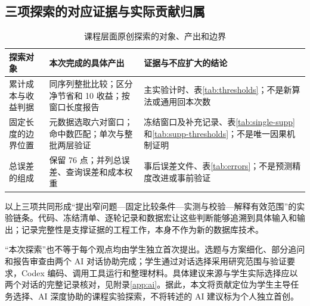 \subsection{三项探索的对应证据与实际贡献归属}
\begin{table}[htbp]
\centering\small
\caption{课程层面原创探索的对象、产出和边界}\label{tab:innovation-map}
\begin{tabularx}{\linewidth}{@{}>{\raggedright\arraybackslash}p{.18\linewidth}YY@{}}
\toprule
探索对象 & 本次完成的具体产出 & 证据与不应扩大的结论\\
\midrule
累计成本与收益判据 & 同序列整批比较；区分净节省和 10\pct{} 收益；按窗口长度报告 & 主实验计时、表\ref{tab:thresholds}；不是新算法或通用回本次数\\
固定长度的边界位置 & 元数据选取六对窗口；命中数匹配；单次与整批两层验证 & 冻结窗口及补充记录、表\ref{tab:single-supp}和\ref{tab:supp-thresholds}；不是唯一因果机制证明\\
总误差的组成 & 保留 76 点；并列总误差、查询误差和成本权重 & 事后误差文件、表\ref{tab:errors}；不是预测精度改进或事前验证\\
\bottomrule
\end{tabularx}
\end{table}

以上三项共同形成“提出窄问题---固定比较条件---实测与校验---解释有效范围”的实验链条。代码、冻结清单、逐轮记录和数据宏让这些判断能够追溯到具体输入和输出；记录完整性是支撑证据的工程工作，本身不作为新的数据库技术。

“本次探索”也不等于每个观点均由学生独立首次提出。选题与方案细化、部分追问和报告审查由两个 AI 对话协助完成；学生通过对话选择采用研究范围与验证要求，Codex 编码、调用工具运行和整理材料。具体建议来源与学生实际选择应以两个对话的完整记录核对，见附录\ref{app:ai}。据此，本文将贡献定位为学生主导任务选择、AI 深度协助的课程实验探索，不将转述的 AI 建议标为个人独立首创。
\FloatBarrier

